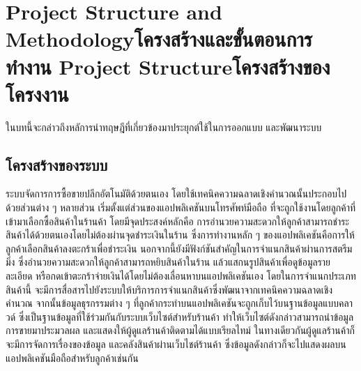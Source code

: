 \chapter{\ifproject%
    \ifenglish Project Structure and Methodology\else โครงสร้างและขั้นตอนการทำงาน\fi
  \else%
    \ifenglish Project Structure\else โครงสร้างของโครงงาน\fi
  \fi
 }

ในบทนี้จะกล่าวถึงหลัการนําทฤษฎีที่เกี่ยวข้องมาประยุกต์ใช้ในการออกแบบ และพัฒนาระบบ


\makeatletter


\makeatother
\section{โครงสร้างของระบบ}


\par ระบบจัดการการซื้อขายปลีกอัตโนมัติด้วยตนเอง โดยใช้เทคนิคความฉลาดเชิงคำนวณนั้นประกอบไปด้วยส่วนต่าง ๆ หลายส่วน เริ่มตั้งแต่ส่วนของแอปพลิเคชันบนโทรศัพท์มือถือ ที่จะถูกใช้งานโดยลูกค้าที่เข้ามาเลือกซื้อสินค้าในร้านค้า โดยมีจุดประสงค์หลักคือ การอำนวยความสะดวกให้ลูกค้าสามารถชำระสินค้าได้ด้วยตนเองโดยไม่ต้องผ่านจุดชำระเงินในร้าน ซึ่งการทำงานหลัก ๆ ของแอปพลิเคชันคือการให้ลูกค้าเลือกสินค้าลงตะกร้าเพื่อชำระเงิน นอกจากนี้ยังมีฟังก์ชันสำคัญในการจำแนกสินค้าผ่านการสตรีมมิ่ง ซึ่งอำนวยความสะดวกให้ลูกค้าสามารถหยิบสินค้าในร้าน แล้วแสกนรูปสินค้าเพื่อดูข้อมูลรายละเอียด หรือกดเข้าตะกร้าจ่ายเงินได้โดยไม่ต้องเลื่อนหาบนแอปพลิเคชันเอง โดยในการจำแนกประเภทสินค้านี้ จะมีการสื่อสารไปยังระบบให้บริการการจำแนกสินค้าซึ่งพัฒนาจากเทคนิคความฉลาดเชิงคำนวณ จากนั้นข้อมูลธุรกรรมต่าง ๆ ที่ลูกค้ากระทำบนแอปพลิเคชันจะถูกเก็บไว้บนฐานข้อมูลแบบคลาวด์ ซึ่งเป็นฐานข้อมูลที่ใช้ร่วมกันกับระบบเว็บไซต์สำหรับร้านค้า ทำให้เว็บไซต์ดังกล่าวสามารถนำข้อมูลการขายมาประมวลผล และแสดงให้ผู้ดูแลร้านค้าติดตามได้แบบเรียลไทม์ ในทางเดียวกันผู้ดูแลร้านค้าก็จะมีการจัดการเรื่องของข้อมูล และคลังสินค้าผ่านเว็บไชต์ร้านค้า ซึ่งข้อมูลดังกล่าวก็จะไปแสดงผลบนแอปพลิเคชันมือถือสำหรับลูกค้าเช่นกัน

